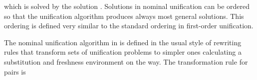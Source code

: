 \begin{isabellebody}
\begin{isamarkuptext}
  \begin{center}
  \end{center}

  \noindent
  which is solved by the solution .
  Solutions in nominal unification can be ordered so that the unification 
  algorithm produces always most general solutions.  This ordering is defined
  very similar to the standard ordering in first-order unification.

  The nominal unification algorithm
  in \cite{UrbanPittsGabbay04} is defined in the usual style of rewriting rules that transform
  sets of unification problems to simpler ones calculating a substitution and
  freshness environment on the way. The transformation rule for pairs is

  \begin{center}
  \end{center}


\end{isamarkuptext}
\end{isabellebody}
